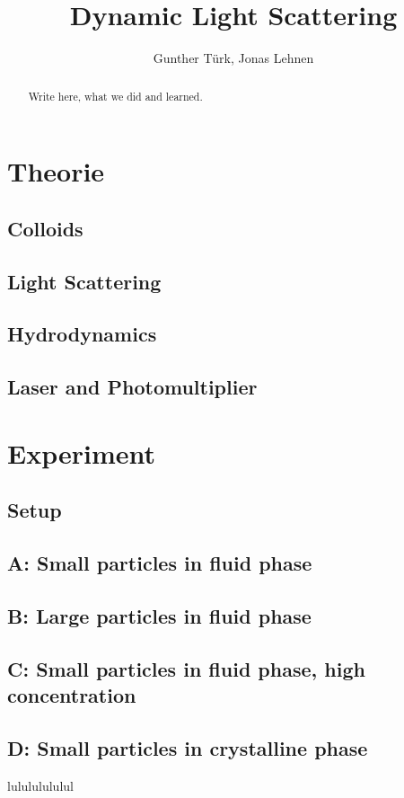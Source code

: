\documentclass[]{article}
\title{Dynamic Light Scattering}
\author{Gunther T\"urk, Jonas Lehnen}
\begin{document}
\maketitle
\tableofcontents
\begin{abstract}


Write here, what we did and learned.
\end{abstract}

\section{Theorie}
\subsection{Colloids}

\subsection{Light Scattering}

\subsection{Hydrodynamics}

\subsection{Laser and Photomultiplier}


\section{Experiment}
\subsection{Setup}

\subsection{A: Small particles in fluid phase}

\subsection{B: Large particles in fluid phase}

\subsection{C: Small particles in fluid phase, high concentration}

\subsection{D: Small particles in crystalline phase}


\newpage
\begin{thebibliography}{9}

 lulululululul

\end{thebibliography}
\end{document}
